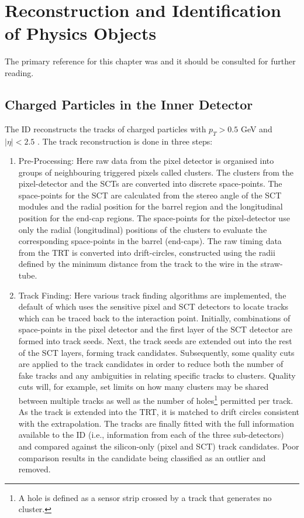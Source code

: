 \chapter{Reconstruction and Identification of Physics Objects}
The primary reference for this chapter was \cite{ATLAS} and it should be consulted for further reading.
\section{Charged Particles in the Inner Detector}
\label{charged_reco}
The ID reconstructs the tracks of charged particles with $p_{T} > 0.5$ GeV and $ | \eta | < 2.5$ \cite{ATLAS}.  The track reconstruction is done in three steps:
\begin{enumerate}
\item Pre-Processing: Here raw data from the pixel detector is organised into groups of neighbouring triggered pixels called clusters. The clusters from the pixel-detector and the SCTs are converted into discrete space-points. The space-points for the SCT are calculated from the stereo angle of the SCT modules and the radial position for the barrel region and the longitudinal position for the end-cap regions. The space-points for the pixel-detector use only the radial (longitudinal) positions of the clusters to evaluate the corresponding space-points in the barrel (end-caps). The raw timing data from the TRT is converted into drift-circles, constructed using the radii defined by the minimum distance from the track to the wire in the straw-tube.
\item Track Finding: Here various track finding algorithms are implemented, the default of which uses the sensitive pixel and SCT detectors to locate tracks which can be traced back to the interaction point. Initially, combinations of space-points in the pixel detector and the first layer of the SCT detector are formed into track seeds. Next, the track seeds are extended out into the rest of the SCT layers, forming track candidates. Subsequently, some quality cuts are applied to the track candidates in order to reduce both the number of fake tracks and any ambiguities in relating specific tracks to clusters. Quality cuts will, for example, set limits on how many clusters may be shared between multiple tracks as well as the number of holes\footnote{A hole is defined as a sensor strip crossed by a track that generates no cluster.} permitted per track. As the track is extended into the TRT, it is matched to drift circles consistent with the extrapolation. The tracks are finally fitted with the full information available to the ID (i.e., information from each of the three sub-detectors) and compared against the silicon-only (pixel and SCT) track candidates. Poor comparison results in the candidate being classified as an outlier and removed.

\end{enumerate}
